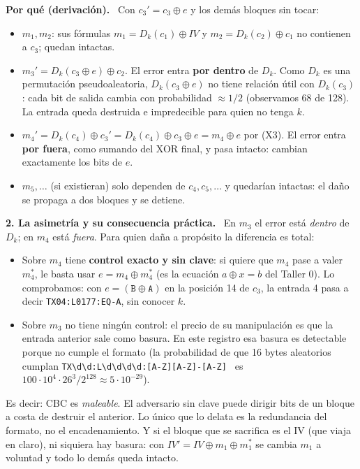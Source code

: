 \documentclass[11pt,letterpaper]{article}
\newcommand{\xor}{\oplus}
\newcommand{\paso}[1]{\par\smallskip\noindent\textbf{#1.}\ }
\begin{document}
\paso{Por qué (derivación)} Con $c_3' = c_3\xor e$ y los demás bloques sin tocar:
\begin{itemize}[itemsep=2pt]
  \item $m_1, m_2$: sus fórmulas $m_1 = D_k(c_1)\xor IV$ y $m_2 = D_k(c_2)\xor c_1$ no contienen a $c_3$; quedan intactas.
  \item $m_3' = D_k(c_3\xor e)\xor c_2$. El error entra \textbf{por dentro} de $D_k$. Como $D_k$ es una permutación
        pseudoaleatoria, $D_k(c_3\xor e)$ no tiene relación útil con $D_k(c_3)$: cada bit de salida cambia con
        probabilidad $\approx 1/2$ (observamos 68 de 128). La entrada queda destruida e impredecible para quien no tenga $k$.
  \item $m_4' = D_k(c_4)\xor c_3' = D_k(c_4)\xor c_3\xor e = m_4\xor e$ por (X3). El error entra \textbf{por fuera},
        como sumando del XOR final, y pasa intacto: cambian exactamente los bits de $e$.
  \item $m_5,\dots$ (si existieran) solo dependen de $c_4, c_5,\dots$ y quedarían intactas: el daño se propaga a
        dos bloques y se detiene.
\end{itemize}

\paso{2. La asimetría y su consecuencia práctica}
En $m_3$ el error está \emph{dentro} de $D_k$; en $m_4$ está \emph{fuera}. Para quien daña a propósito
la diferencia es total:
\begin{itemize}[itemsep=2pt]
  \item Sobre $m_4$ tiene \textbf{control exacto y sin clave}: si quiere que $m_4$ pase a valer $m_4^*$, le basta
        usar $e = m_4\xor m_4^*$ (es la ecuación $a\xor x=b$ del Taller 0). Lo comprobamos: con
        $e = (\texttt{B}\xor\texttt{A})$ en la posición 14 de $c_3$, la entrada 4 pasa a decir
        \texttt{TX04:L0177:EQ-A}, sin conocer $k$.
  \item Sobre $m_3$ no tiene ningún control: el precio de su manipulación es que la entrada anterior
        sale como basura. En este registro esa basura es detectable porque no cumple el formato
        (la probabilidad de que 16 bytes aleatorios cumplan
        \verb|TX\d\d:L\d\d\d\d:[A-Z][A-Z]-[A-Z] | es $100\cdot 10^4\cdot 26^3/2^{128}\approx 5\cdot10^{-29}$).
\end{itemize}
Es decir: CBC es \emph{maleable}. El adversario sin clave puede dirigir bits de un bloque a costa de
destruir el anterior. Lo único que lo delata es la redundancia del formato, no el encadenamiento.
Y si el bloque que se sacrifica es el IV (que viaja en claro), ni siquiera hay basura: con
$IV' = IV\xor m_1\xor m_1^*$ se cambia $m_1$ a voluntad y todo lo demás queda intacto.
\end{document}
